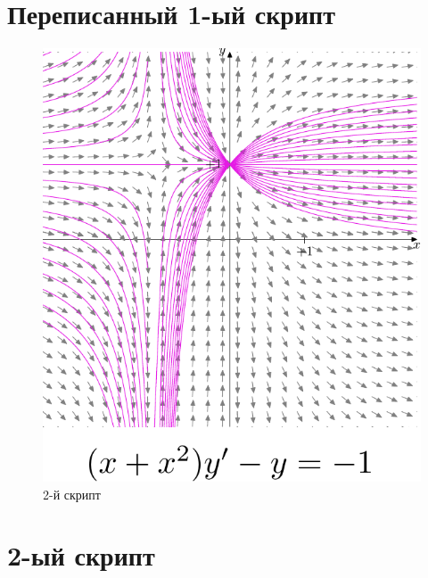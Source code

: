 \section*{Переписанный 1-ый скрипт}


\begin{figure}[h]
    \includegraphics{fig2-1.pdf}
    \centering
    \caption{2-й скрипт}
\end{figure}

\section*{2-ый скрипт}


